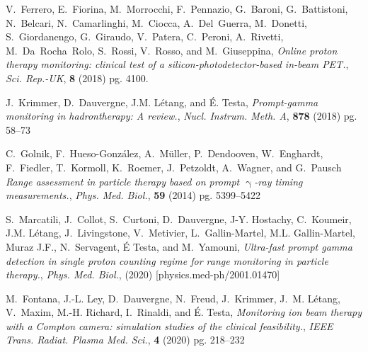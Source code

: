 \documentclass[a4paper,11pt]{article}
\begin{document}
\begin{thebibliography}{99}
V.~Ferrero, E.~Fiorina, M.~Morrocchi, F.~Pennazio, G.~Baroni, G.~Battistoni,
  N.~Belcari, N.~Camarlinghi, M.~Ciocca, A.~Del~Guerra, M.~Donetti,
  S.~Giordanengo, G.~Giraudo, V.~Patera, C.~Peroni, A.~Rivetti,
  M.~Da~Rocha~Rolo, S.~Rossi, V.~Rosso, and M.~Giuseppina, \emph{Online proton therapy monitoring: clinical test of a
  silicon-photodetector-based in-beam {PET}.}, \emph{Sci. Rep.-UK}, \textbf{8} (2018) pg. 4100.

J.~Krimmer, D.~Dauvergne, J.M. L\'etang, and \'E. Testa, \emph{Prompt-gamma monitoring in hadrontherapy: A review.}, \emph{Nucl. Instrum. Meth. A}, \textbf{878} (2018) pg. 58--73

C.~Golnik, F.~Hueso-Gonz{\'{a}}lez, A.~Müller, P.~Dendooven, W.~Enghardt,
  F.~Fiedler, T.~Kormoll, K.~Roemer, J.~Petzoldt, A.~Wagner, and G.~Pausch \emph{Range assessment in particle therapy based on prompt $\upgamma$-ray timing measurements.}, \emph{Phys. Med. Biol.}, \textbf{59} (2014) pg. 5399--5422

S.~Marcatili, J.~Collot, S.~Curtoni, D.~Dauvergne, J-Y. Hostachy, C.~Koumeir,
  J.M. L\'{e}tang, J.~Livingstone, V.~Metivier, L.~Gallin-Martel, M.L.
  Gallin-Martel, Muraz J.F., N.~Servagent, \'{E} Testa, and M.~Yamouni, \emph{Ultra-fast prompt gamma detection in single proton counting regime
  for range monitoring in particle therapy.}, \emph{Phys. Med. Biol.}, (2020) [physics.med-ph/2001.01470]

M.~{Fontana}, J.-L. {Ley}, D.~{Dauvergne}, N.~{Freud}, J.~{Krimmer}, J.~M.
  {L\'etang}, V.~{Maxim}, M.-H. {Richard}, I.~{Rinaldi}, and \'E. {Testa}, \emph{Monitoring ion beam therapy with a {C}ompton camera: simulation
  studies of the clinical feasibility.}, \emph{IEEE Trans. Radiat. Plasma Med. Sci.}, \textbf{4} (2020) pg. 218--232


\end{thebibliography}
\end{document}
